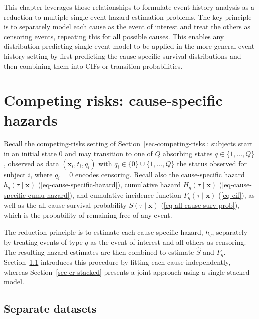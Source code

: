 \documentclass[
  letterpaper,
  krantz2]{style/krantz}
\begin{document}
This chapter leverages those relationships to formulate event history
analysis as a reduction to multiple single-event hazard estimation
problems.
The key principle is to separately model each cause as the event of
interest and treat the others as censoring events, repeating this for
all possible causes. This enables any distribution-predicting
single-event model to be applied in the more general event history
setting by first predicting the cause-specific survival distributions
and then combining them into CIFs or transition probabilities.

\section{Competing risks: cause-specific
hazards}\label{sec-cr-reduction}

Recall the competing-risks setting of Section~\ref{sec-competing-risks}:
subjects start in an initial state \(0\) and may transition to one of
\(Q\) absorbing states \(q \in \{1,\ldots,Q\}\), observed as data
\((\mathbf{x}_i, t_i, q_i)\) with \(q_i \in \{0\}\cup \{1,\ldots, Q\}\)
the status observed for subject \(i\), where \(q_i=0\) encodes
censoring.
Recall also the cause-specific hazard \(h_q(\tau \mid \mathbf{x})\)
(\ref{eq-cause-specific-hazard}), cumulative hazard
\(H_q(\tau \mid \mathbf{x})\) (\ref{eq-cause-specific-cumu-hazard}), and
cumulative incidence function \(F_q(\tau \mid \mathbf{x})\)
(\ref{eq-cif}), as well as the all-cause survival probability
\(S(\tau \mid \mathbf{x})\) (\ref{eq-all-cause-surv-prob}), which is the
probability of remaining free of any event.

The reduction principle is to estimate each cause-specific hazard,
\(h_q\), separately by treating events of type \(q\) as the event of
interest and all others as censoring. The resulting hazard estimates are
then combined to estimate \(\hat{S}\) and \(\hat{F}_q\).
Section~\ref{sec-cr-separate} introduces this procedure by fitting each
cause independently, whereas Section~\ref{sec-cr-stacked} presents a
joint approach using a single stacked model.

\subsection{Separate datasets}\label{sec-cr-separate}
\end{document}
